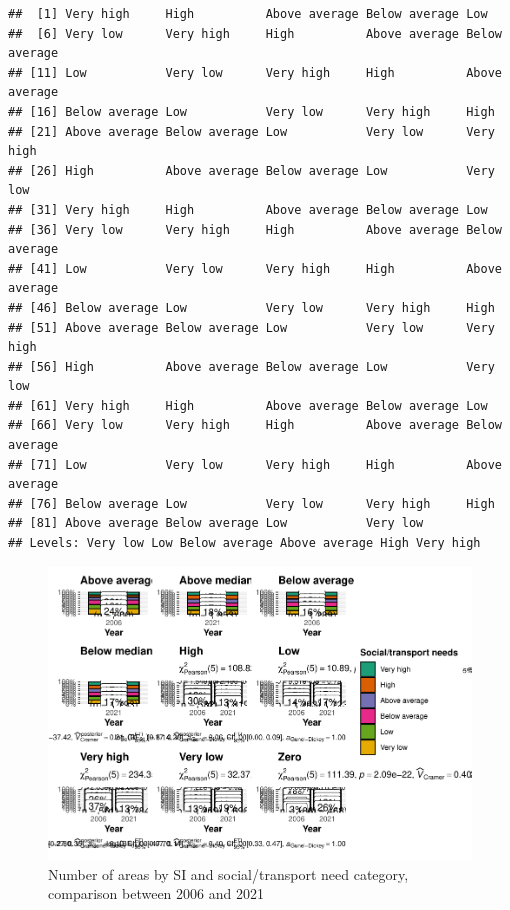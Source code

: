 \documentclass[preprint, 3p,
authoryear]{elsarticle} %
\begin{document}
\begin{verbatim}
##  [1] Very high     High          Above average Below average Low          
##  [6] Very low      Very high     High          Above average Below average
## [11] Low           Very low      Very high     High          Above average
## [16] Below average Low           Very low      Very high     High         
## [21] Above average Below average Low           Very low      Very high    
## [26] High          Above average Below average Low           Very low     
## [31] Very high     High          Above average Below average Low          
## [36] Very low      Very high     High          Above average Below average
## [41] Low           Very low      Very high     High          Above average
## [46] Below average Low           Very low      Very high     High         
## [51] Above average Below average Low           Very low      Very high    
## [56] High          Above average Below average Low           Very low     
## [61] Very high     High          Above average Below average Low          
## [66] Very low      Very high     High          Above average Below average
## [71] Low           Very low      Very high     High          Above average
## [76] Below average Low           Very low      Very high     High         
## [81] Above average Below average Low           Very low     
## Levels: Very low Low Below average Above average High Very high
\end{verbatim}

\begin{figure}
\centering
\includegraphics{Leveraging_GTFS_to_assess_transit_supply_Transport_Geography_files/figure-latex/Greater_Melbourne_2006_2021_needs_gap_zones-1.pdf}
\caption{Number of areas by SI and social/transport need category,
comparison between 2006 and 2021}
\end{figure}
\end{document}
